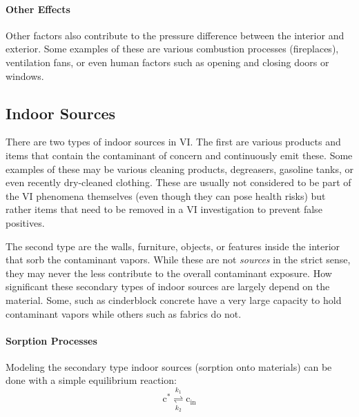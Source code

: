 \paragraph{Other Effects}

Other factors also contribute to the pressure difference between the interior and exterior.
Some examples of these are various combustion processes (fireplaces), ventilation fans, or even human factors such as opening and closing doors or windows.

\subsection{Indoor Sources}

There are two types of indoor sources in VI.
The first are various products and items that contain the contaminant of concern and continuously emit these.
Some examples of these may be various cleaning products, degreasers, gasoline tanks, or even recently dry-cleaned clothing.
These are usually not considered to be part of the VI phenomena themselves (even though they can pose health risks) but rather items that need to be removed in a VI investigation to prevent false positives.\par

The second type are the walls, furniture, objects, or features inside the interior that sorb the contaminant vapors.
While these are not \textit{sources} in the strict sense, they may never the less contribute to the overall contaminant exposure.
How significant these secondary types of indoor sources are largely depend on the material.
Some, such as cinderblock concrete have a very large capacity to hold contaminant vapors while others such as fabrics do not.\par


\paragraph{Sorption Processes}

Modeling the secondary type indoor sources (sorption onto materials) can be done with a simple equilibrium reaction:
\begin{equation}\label{eq:sorption_rxn}
  \mathrm{c^*} \underset{k_2}{\stackrel{k_1}{\rightleftharpoons}} \mathrm{c_{in}}
\end{equation}

